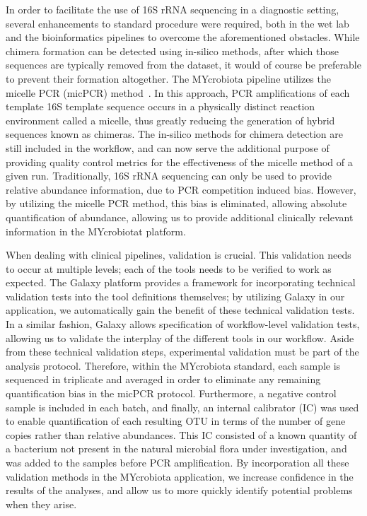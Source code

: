 In order to facilitate the use of 16S rRNA sequencing in a diagnostic setting, several enhancements to standard procedure were required, both in the wet lab and the bioinformatics pipelines to overcome the aforementioned obstacles.
While chimera formation can be detected using in-silico methods, after which those sequences are typically removed from the dataset, it would of course be preferable to prevent their formation altogether. The MYcrobiota pipeline utilizes the micelle PCR (micPCR) method~\cite{boers2015micelle,boers2017novel}. In this approach, PCR amplifications of each template 16S template sequence occurs in a physically distinct reaction environment called a micelle, thus greatly reducing the generation of hybrid sequences known as chimeras. The in-silico methods for chimera detection are still included in the workflow, and can now serve the additional purpose of providing quality control metrics for the effectiveness of the micelle method of a given run.
Traditionally, 16S rRNA sequencing can only be used to provide relative abundance information, due to PCR competition induced bias. However, by utilizing the micelle PCR method, this bias is eliminated, allowing absolute quantification of abundance, allowing us to provide additional clinically relevant information in the MYcrobiotat platform.

When dealing with clinical pipelines, validation is crucial. This validation needs to occur at multiple levels; each of the tools needs to be verified to work as expected. The Galaxy platform provides a framework for incorporating technical validation tests into the tool definitions themselves; by utilizing Galaxy in our application, we automatically gain the benefit of these technical validation tests. In a similar fashion, Galaxy allows specification of workflow-level validation tests, allowing us to validate the interplay of the different tools in our workflow. Aside from these technical validation steps, experimental validation must be part of the analysis protocol. Therefore, within the MYcrobiota standard, each sample is sequenced in triplicate and averaged in order to eliminate any remaining quantification bias in the micPCR protocol. Furthermore, a negative control sample is included in each batch, and finally, an internal calibrator (IC) was used to enable quantification of each resulting OTU in terms of the number of gene copies rather than relative abundances. This IC consisted of a known quantity of a bacterium not present in the natural microbial flora under investigation, and was added to the samples before PCR amplification. By incorporation all these validation methods in the MYcrobiota application, we increase confidence in the results of the analyses, and allow us to more quickly identify potential problems when they arise.

